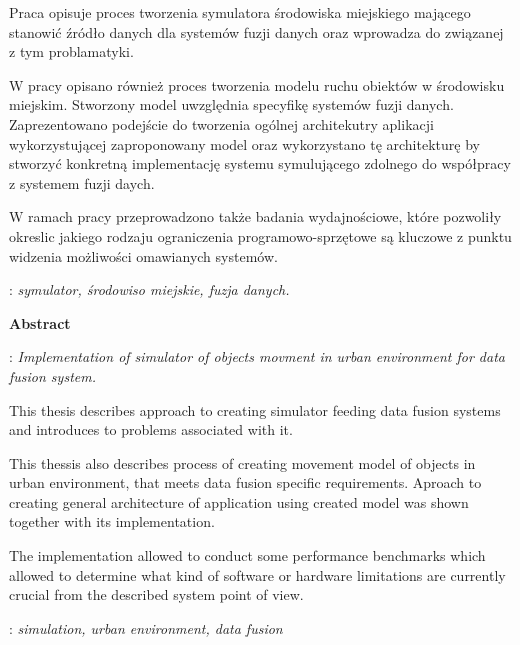 \begin{titlepage}
    {\itshape
    \par{
    Praca opisuje proces tworzenia symulatora środowiska miejskiego mającego stanowić źródło danych dla systemów fuzji danych oraz wprowadza do związanej z tym problamatyki.
	}    
    \par{
	W pracy opisano również proces tworzenia modelu ruchu obiektów w środowisku miejskim. Stworzony model uwzględnia specyfikę systemów fuzji danych. Zaprezentowano podejście do tworzenia ogólnej architekutry aplikacji wykorzystującej zaproponowany model oraz wykorzystano tę architekturę by stworzyć konkretną implementację systemu symulującego zdolnego do współpracy z systemem fuzji daych.
	}
	\par{
	W ramach pracy przeprowadzono także badania wydajnościowe, które pozwoliły okreslic jakiego rodzaju ograniczenia programowo-sprzętowe są kluczowe z punktu widzenia możliwości omawianych systemów.
	}
    }
    \vspace*{1\baselineskip}

    : {\itshape symulator, środowiso miejskie, fuzja danych.}
    \par
    \vspace{4\baselineskip}
    \begin{center}
	{\large\bfseries Abstract}\par\bigskip
    \end{center}
    : {\itshape Implementation of simulator of objects movment in urban environment for data fusion system.
    }\par
    \vspace*{1\baselineskip}
    {\itshape
    \par{
    This thesis describes approach to creating simulator feeding data fusion systems and introduces to problems associated with it.
	}
    \par{
    This thessis also describes process of creating movement model of objects in urban environment, that meets data fusion specific requirements. Aproach to creating general architecture of application using created model was shown together with its implementation.
	}
	\par{
	The implementation allowed to conduct some performance benchmarks which allowed to determine what kind of software or hardware limitations are currently crucial from the described system point of view.
	}
    }
    \vspace*{1\baselineskip}

    : {\itshape simulation, urban environment, data fusion}

\end{titlepage}

